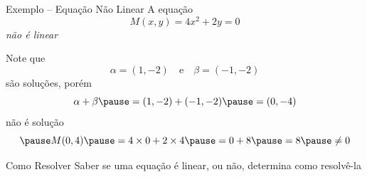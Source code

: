 \documentclass[fleqn,aspectratio=169,12pt]{beamer}
\begin{document}
\begin{frame}{Exemplo -- Equação Não Linear}
  A equação
  \[
    M(x, y) = 4x^2 + 2y = 0
  \]
  \emph{não é linear}

  \pause
  Note que
  \[
    \alpha = (1, -2)
    \quad\text{e}\quad
    \beta  = (-1, -2)
  \]
  são soluções,
  \pause
  porém
  \[
    \alpha + \beta
    \pause
    = (1, -2) + (-1, -2)
    \pause
    = (0, -4)
  \]
  \pause
  não é solução
  \[
    \pause
    M(0, 4)
    \pause
    = 4\times 0 + 2\times 4
    \pause
    = 0 + 8
    \pause
    = 8
    \pause
    \neq 0
  \]
\end{frame}

\begin{frame}{Como Resolver}
  Saber se uma equação é linear, ou não, determina como resolvê-la
\end{frame}

%
%

\end{document}
